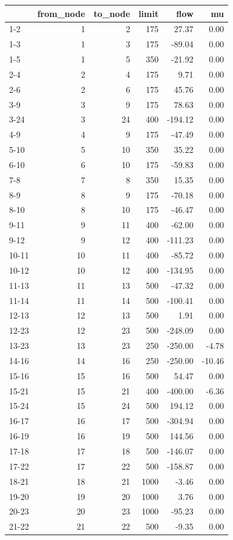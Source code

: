 \begin{tabular}{lrrrrr}
\toprule
 & from\_node & to\_node & limit & flow & mu \\
\midrule
1-2 & 1 & 2 & 175 & 27.37 & 0.00 \\
1-3 & 1 & 3 & 175 & -89.04 & 0.00 \\
1-5 & 1 & 5 & 350 & -21.92 & 0.00 \\
2-4 & 2 & 4 & 175 & 9.71 & 0.00 \\
2-6 & 2 & 6 & 175 & 45.76 & 0.00 \\
3-9 & 3 & 9 & 175 & 78.63 & 0.00 \\
3-24 & 3 & 24 & 400 & -194.12 & 0.00 \\
4-9 & 4 & 9 & 175 & -47.49 & 0.00 \\
5-10 & 5 & 10 & 350 & 35.22 & 0.00 \\
6-10 & 6 & 10 & 175 & -59.83 & 0.00 \\
7-8 & 7 & 8 & 350 & 15.35 & 0.00 \\
8-9 & 8 & 9 & 175 & -70.18 & 0.00 \\
8-10 & 8 & 10 & 175 & -46.47 & 0.00 \\
9-11 & 9 & 11 & 400 & -62.00 & 0.00 \\
9-12 & 9 & 12 & 400 & -111.23 & 0.00 \\
10-11 & 10 & 11 & 400 & -85.72 & 0.00 \\
10-12 & 10 & 12 & 400 & -134.95 & 0.00 \\
11-13 & 11 & 13 & 500 & -47.32 & 0.00 \\
11-14 & 11 & 14 & 500 & -100.41 & 0.00 \\
12-13 & 12 & 13 & 500 & 1.91 & 0.00 \\
12-23 & 12 & 23 & 500 & -248.09 & 0.00 \\
13-23 & 13 & 23 & 250 & -250.00 & -4.78 \\
14-16 & 14 & 16 & 250 & -250.00 & -10.46 \\
15-16 & 15 & 16 & 500 & 54.47 & 0.00 \\
15-21 & 15 & 21 & 400 & -400.00 & -6.36 \\
15-24 & 15 & 24 & 500 & 194.12 & 0.00 \\
16-17 & 16 & 17 & 500 & -304.94 & 0.00 \\
16-19 & 16 & 19 & 500 & 144.56 & 0.00 \\
17-18 & 17 & 18 & 500 & -146.07 & 0.00 \\
17-22 & 17 & 22 & 500 & -158.87 & 0.00 \\
18-21 & 18 & 21 & 1000 & -3.46 & 0.00 \\
19-20 & 19 & 20 & 1000 & 3.76 & 0.00 \\
20-23 & 20 & 23 & 1000 & -95.23 & 0.00 \\
21-22 & 21 & 22 & 500 & -9.35 & 0.00 \\
\bottomrule
\end{tabular}
